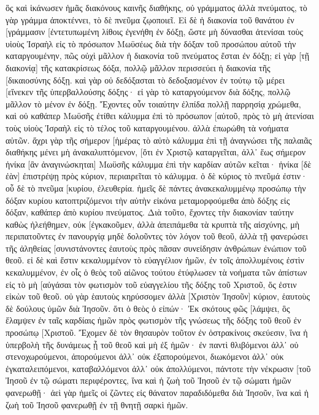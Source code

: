 ὃς καὶ ἱκάνωσεν ἡμᾶς διακόνους καινῆς διαθήκης, οὐ γράμματος ἀλλὰ πνεύματος, τὸ γὰρ γράμμα ἀποκτέννει, τὸ δὲ πνεῦμα ζῳοποιεῖ. 
Εἰ δὲ ἡ διακονία τοῦ θανάτου ἐν [γράμμασιν [ἐντετυπωμένη λίθοις ἐγενήθη ἐν δόξῃ, ὥστε μὴ δύνασθαι ἀτενίσαι τοὺς υἱοὺς Ἰσραὴλ εἰς τὸ πρόσωπον Μωϋσέως διὰ τὴν δόξαν τοῦ προσώπου αὐτοῦ τὴν καταργουμένην, 
πῶς οὐχὶ μᾶλλον ἡ διακονία τοῦ πνεύματος ἔσται ἐν δόξῃ; 
εἰ γὰρ [τῇ διακονίᾳ] τῆς κατακρίσεως δόξα, πολλῷ μᾶλλον περισσεύει ἡ διακονία τῆς [δικαιοσύνης δόξῃ. 
καὶ γὰρ οὐ δεδόξασται τὸ δεδοξασμένον ἐν τούτῳ τῷ μέρει [εἵνεκεν τῆς ὑπερβαλλούσης δόξης· 
εἰ γὰρ τὸ καταργούμενον διὰ δόξης, πολλῷ μᾶλλον τὸ μένον ἐν δόξῃ. 
Ἔχοντες οὖν τοιαύτην ἐλπίδα πολλῇ παρρησίᾳ χρώμεθα, 
καὶ οὐ καθάπερ Μωϋσῆς ἐτίθει κάλυμμα ἐπὶ τὸ πρόσωπον [αὐτοῦ, πρὸς τὸ μὴ ἀτενίσαι τοὺς υἱοὺς Ἰσραὴλ εἰς τὸ τέλος τοῦ καταργουμένου. 
ἀλλὰ ἐπωρώθη τὰ νοήματα αὐτῶν. ἄχρι γὰρ τῆς σήμερον [ἡμέρας τὸ αὐτὸ κάλυμμα ἐπὶ τῇ ἀναγνώσει τῆς παλαιᾶς διαθήκης μένει μὴ ἀνακαλυπτόμενον, [ὅτι ἐν Χριστῷ καταργεῖται, 
ἀλλ᾽ ἕως σήμερον ἡνίκα [ἂν ἀναγινώσκηται] Μωϋσῆς κάλυμμα ἐπὶ τὴν καρδίαν αὐτῶν κεῖται· 
ἡνίκα [δὲ ἐὰν] ἐπιστρέψῃ πρὸς κύριον, περιαιρεῖται τὸ κάλυμμα. 
ὁ δὲ κύριος τὸ πνεῦμά ἐστιν· οὗ δὲ τὸ πνεῦμα [κυρίου, ἐλευθερία. 
ἡμεῖς δὲ πάντες ἀνακεκαλυμμένῳ προσώπῳ τὴν δόξαν κυρίου κατοπτριζόμενοι τὴν αὐτὴν εἰκόνα μεταμορφούμεθα ἀπὸ δόξης εἰς δόξαν, καθάπερ ἀπὸ κυρίου πνεύματος. 
Διὰ τοῦτο, ἔχοντες τὴν διακονίαν ταύτην καθὼς ἠλεήθημεν, οὐκ [ἐγκακοῦμεν, 
ἀλλὰ ἀπειπάμεθα τὰ κρυπτὰ τῆς αἰσχύνης, μὴ περιπατοῦντες ἐν πανουργίᾳ μηδὲ δολοῦντες τὸν λόγον τοῦ θεοῦ, ἀλλὰ τῇ φανερώσει τῆς ἀληθείας [συνιστάνοντες ἑαυτοὺς πρὸς πᾶσαν συνείδησιν ἀνθρώπων ἐνώπιον τοῦ θεοῦ. 
εἰ δὲ καὶ ἔστιν κεκαλυμμένον τὸ εὐαγγέλιον ἡμῶν, ἐν τοῖς ἀπολλυμένοις ἐστὶν κεκαλυμμένον, 
ἐν οἷς ὁ θεὸς τοῦ αἰῶνος τούτου ἐτύφλωσεν τὰ νοήματα τῶν ἀπίστων εἰς τὸ μὴ [αὐγάσαι τὸν φωτισμὸν τοῦ εὐαγγελίου τῆς δόξης τοῦ Χριστοῦ, ὅς ἐστιν εἰκὼν τοῦ θεοῦ. 
οὐ γὰρ ἑαυτοὺς κηρύσσομεν ἀλλὰ [Χριστὸν Ἰησοῦν] κύριον, ἑαυτοὺς δὲ δούλους ὑμῶν διὰ Ἰησοῦν. 
ὅτι ὁ θεὸς ὁ εἰπών· Ἐκ σκότους φῶς [λάμψει, ὃς ἔλαμψεν ἐν ταῖς καρδίαις ἡμῶν πρὸς φωτισμὸν τῆς γνώσεως τῆς δόξης τοῦ θεοῦ ἐν προσώπῳ [Χριστοῦ. 
Ἔχομεν δὲ τὸν θησαυρὸν τοῦτον ἐν ὀστρακίνοις σκεύεσιν, ἵνα ἡ ὑπερβολὴ τῆς δυνάμεως ᾖ τοῦ θεοῦ καὶ μὴ ἐξ ἡμῶν· 
ἐν παντὶ θλιβόμενοι ἀλλ᾽ οὐ στενοχωρούμενοι, ἀπορούμενοι ἀλλ᾽ οὐκ ἐξαπορούμενοι, 
διωκόμενοι ἀλλ᾽ οὐκ ἐγκαταλειπόμενοι, καταβαλλόμενοι ἀλλ᾽ οὐκ ἀπολλύμενοι, 
πάντοτε τὴν νέκρωσιν [τοῦ Ἰησοῦ ἐν τῷ σώματι περιφέροντες, ἵνα καὶ ἡ ζωὴ τοῦ Ἰησοῦ ἐν τῷ σώματι ἡμῶν φανερωθῇ· 
ἀεὶ γὰρ ἡμεῖς οἱ ζῶντες εἰς θάνατον παραδιδόμεθα διὰ Ἰησοῦν, ἵνα καὶ ἡ ζωὴ τοῦ Ἰησοῦ φανερωθῇ ἐν τῇ θνητῇ σαρκὶ ἡμῶν. 
